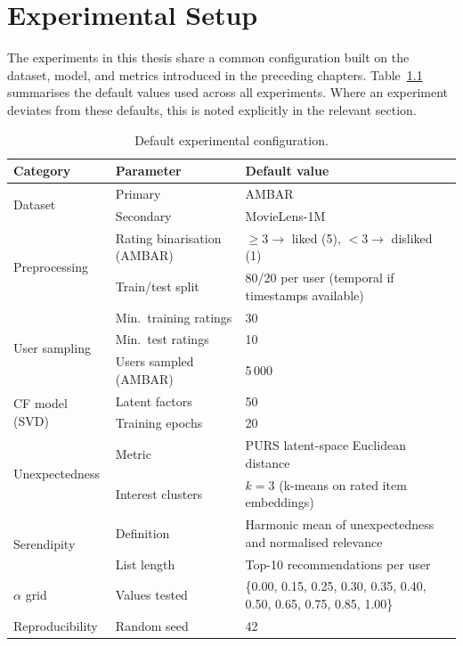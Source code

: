 
\chapter{Experimental Setup}
\label{chap:setup}

The experiments in this thesis share a common configuration built on the
dataset, model, and metrics introduced in the preceding chapters.
Table~\ref{tab:default_setup} summarises the default values used across all
experiments.  Where an experiment deviates from these defaults, this is noted
explicitly in the relevant section.

\begin{table}[h]
\centering
\caption{Default experimental configuration.}
\label{tab:default_setup}
\begin{tabular}{lll}
\toprule
\textbf{Category} & \textbf{Parameter} & \textbf{Default value} \\
\midrule
\multirow{2}{*}{Dataset}
    & Primary   & AMBAR \\
    & Secondary & MovieLens-1M \\
\midrule
\multirow{2}{*}{Preprocessing}
    & Rating binarisation (AMBAR) & $\geq 3 \to$ liked (5),\; $< 3 \to$ disliked (1) \\
    & Train/test split            & 80/20 per user (temporal if timestamps available) \\
\midrule
\multirow{3}{*}{User sampling}
    & Min.\ training ratings  & 30 \\
    & Min.\ test ratings      & 10 \\
    & Users sampled (AMBAR)   & 5\,000 \\
\midrule
\multirow{2}{*}{CF model (SVD)}
    & Latent factors  & 50 \\
    & Training epochs & 20 \\
\midrule
\multirow{2}{*}{Unexpectedness}
    & Metric            & PURS latent-space Euclidean distance \\
    & Interest clusters & $k = 3$ (k-means on rated item embeddings) \\
\midrule
\multirow{2}{*}{Serendipity}
    & Definition      & Harmonic mean of unexpectedness and normalised relevance \\
    & List length     & Top-10 recommendations per user \\
\midrule
$\alpha$ grid
    & Values tested & \{0.00, 0.15, 0.25, 0.30, 0.35, 0.40, 0.50, 0.65, 0.75, 0.85, 1.00\} \\
\midrule
Reproducibility & Random seed & 42 \\
\bottomrule
\end{tabular}
\end{table}
